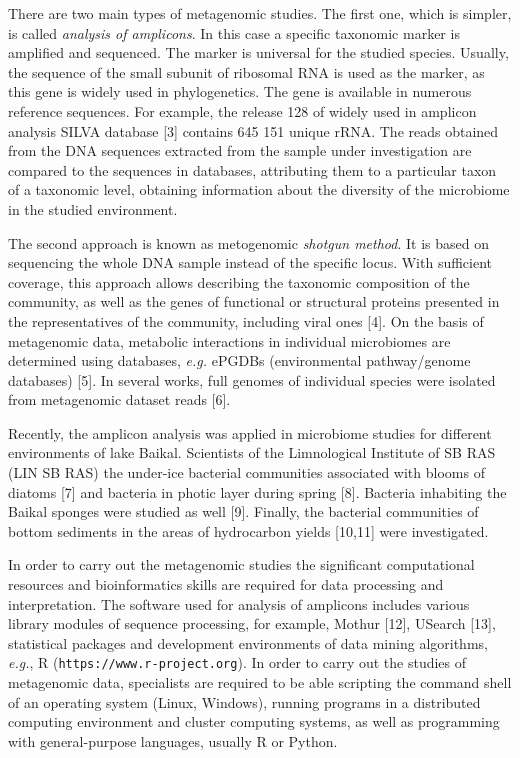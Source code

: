 \documentclass[conference,a4paper]{IEEEtran}
\providecommand\url[1]{\texttt{#1}}
\begin{document}
There are two main types of metagenomic studies.  The first one, which is simpler, is called \emph{analysis of amplicons}.  In this case a specific taxonomic marker is amplified and sequenced.  The marker is universal for the studied species.  Usually, the sequence of the small subunit of ribosomal RNA is used as the marker, as this gene is widely used in phylogenetics.  The gene is available in numerous reference sequences.  For example, the release 128 of widely used in amplicon analysis SILVA database [3] contains 645 151 unique rRNA.  The reads obtained from the DNA sequences extracted from the sample under investigation are compared to the sequences in databases, attributing them to a particular taxon of a taxonomic level, obtaining information about the diversity of the microbiome in the studied environment.

The second approach is known as metogenomic \emph{shotgun method}.  It is based on sequencing the whole DNA sample instead of the specific locus.  With sufficient coverage, this approach allows describing the taxonomic composition of the community, as well as the genes of functional or structural proteins presented in the representatives of the community, including viral ones [4].  On the basis of metagenomic data, metabolic interactions in individual microbiomes are determined using databases, \emph{e.g.} ePGDBs (environmental pathway/genome databases) [5].  In several works, full genomes of individual species were isolated from metagenomic dataset reads [6].

Recently, the amplicon analysis was applied in microbiome studies for different environments of lake Baikal.  Scientists of the Limnological Institute of SB RAS (LIN SB RAS) the under-ice bacterial communities associated with blooms of diatoms [7] and bacteria in photic layer during spring [8].  Bacteria inhabiting the Baikal sponges were studied as well [9].  Finally, the bacterial communities of bottom sediments in the areas of hydrocarbon yields [10,11] were investigated.

In order to carry out the metagenomic studies the significant computational resources and bioinformatics skills are required for data processing and interpretation.  The software used for analysis of amplicons includes various library modules of sequence processing, for example, Mothur [12], USearch [13], statistical packages and development environments of data mining algorithms, \emph{e.g.}, R (\url{https://www.r-project.org}).  In order to carry out the studies of metagenomic data, specialists are required to be able scripting the command shell of an operating system (Linux, Windows), running programs in a distributed computing environment and cluster computing systems, as well as programming with general-purpose languages, usually R or Python.
\end{document}
